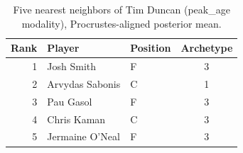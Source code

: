 \begin{table}[htbp]
  \centering\small
  \begin{tabular}{rllc}
    \toprule
    Rank & Player & Position & Archetype \\
    \midrule
    1 & Josh Smith & F & 3 \\
    2 & Arvydas Sabonis & C & 1 \\
    3 & Pau Gasol & F & 3 \\
    4 & Chris Kaman & C & 3 \\
    5 & Jermaine O'Neal & F & 3 \\
    \bottomrule
  \end{tabular}
  \caption{Five nearest neighbors of Tim Duncan (peak_age modality), Procrustes-aligned posterior mean.}
  \label{tab:Tim_Duncan_neighbors_peak_age}
\end{table}

